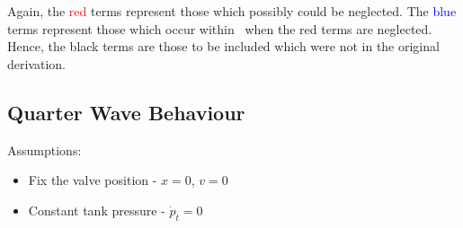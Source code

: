 Again, the \textcolor{Red}{red} terms represent those which possibly could be neglected. The \textcolor{Blue}{blue} terms represent those which occur within~\cite{Hos2015ModelPipe} when the red terms are neglected. Hence, the black terms are those to be included which were not in the original derivation.






\newpage



\newpage
\subsection{Quarter Wave Behaviour}

Assumptions:

\begin{itemize}
    \item Fix the valve position - $x = 0$, $v = 0$
    \item Constant tank pressure - $\dot{p}_t = 0$
\end{itemize}

